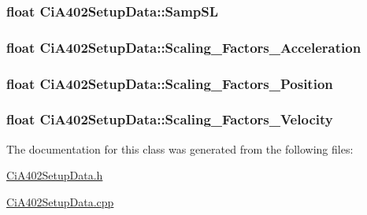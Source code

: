 \subsubsection[{\texorpdfstring{Samp\+SL}{SampSL}}]{\setlength{\rightskip}{0pt plus 5cm}float Ci\+A402\+Setup\+Data\+::\+Samp\+SL\hspace{0.3cm}{\ttfamily [private]}}\hypertarget{classCiA402SetupData_a7dc6400c193ecfe21977437e7c5ac85f}{}\label{classCiA402SetupData_a7dc6400c193ecfe21977437e7c5ac85f}
\subsubsection[{\texorpdfstring{Scaling\+\_\+\+Factors\+\_\+\+Acceleration}{Scaling_Factors_Acceleration}}]{\setlength{\rightskip}{0pt plus 5cm}float Ci\+A402\+Setup\+Data\+::\+Scaling\+\_\+\+Factors\+\_\+\+Acceleration\hspace{0.3cm}{\ttfamily [private]}}\hypertarget{classCiA402SetupData_afa253899425284c2fa62fdb678dc4907}{}\label{classCiA402SetupData_afa253899425284c2fa62fdb678dc4907}
\subsubsection[{\texorpdfstring{Scaling\+\_\+\+Factors\+\_\+\+Position}{Scaling_Factors_Position}}]{\setlength{\rightskip}{0pt plus 5cm}float Ci\+A402\+Setup\+Data\+::\+Scaling\+\_\+\+Factors\+\_\+\+Position\hspace{0.3cm}{\ttfamily [private]}}\hypertarget{classCiA402SetupData_a81ef1e6479ad92e748e33921dbf3cd25}{}\label{classCiA402SetupData_a81ef1e6479ad92e748e33921dbf3cd25}
\subsubsection[{\texorpdfstring{Scaling\+\_\+\+Factors\+\_\+\+Velocity}{Scaling_Factors_Velocity}}]{\setlength{\rightskip}{0pt plus 5cm}float Ci\+A402\+Setup\+Data\+::\+Scaling\+\_\+\+Factors\+\_\+\+Velocity\hspace{0.3cm}{\ttfamily [private]}}\hypertarget{classCiA402SetupData_a1ac5a8bab56e6282f87684d4c7249225}{}\label{classCiA402SetupData_a1ac5a8bab56e6282f87684d4c7249225}


The documentation for this class was generated from the following files\+:\begin{DoxyCompactItemize}
\item 
\hyperlink{CiA402SetupData_8h}{Ci\+A402\+Setup\+Data.\+h}\item 
\hyperlink{CiA402SetupData_8cpp}{Ci\+A402\+Setup\+Data.\+cpp}\end{DoxyCompactItemize}
